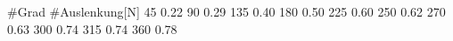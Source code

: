 #Grad #Auslenkung[N]
45 0.22
90 0.29
135 0.40
180 0.50
225 0.60
250 0.62
270 0.63
300 0.74
315 0.74
360 0.78
